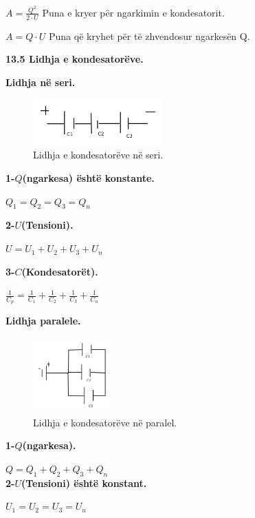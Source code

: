 \documentclass[twocolumn]{article}
\begin{document}
	$A=\frac{Q^2}{2\cdot U}$ Puna e kryer për ngarkimin e kondesatorit.
	
	$A=Q \cdot U$ Puna që kryhet për të zhvendosur ngarkesën Q.
	
	\textbf{13.5 Lidhja e kondesatorëve. }
	
	\begin{center}
		\textbf{Lidhja në seri.}
	\end{center}
	
	\begin{figure}[h]
		\includegraphics[width=50mm]{Imazhet/Lidhjet ne seri.png}
		\caption{ Lidhja e kondesatorëve në seri.}
		\label{fig:boat1}
	\end{figure}
	
	\textbf{1-$Q$(ngarkesa) është konstante.}
	
	$Q_1=Q_2=Q_3=Q_n$
	
	\textbf{2-$U$(Tensioni).}
	
	$U=U_1+U_2+U_3+U_n$
	
	\textbf{3-$C$(Kondesatorët).}
	
	$\frac{1}{C_p}=\frac{1}{C_1}+\frac{1}{C_2}+\frac{1}{C_3}+\frac{1}{C_n}$
	
	
	\begin{center}
		\textbf{Lidhja paralele.}
	\end{center}
	\begin{figure}[h]
		\includegraphics[width=30mm]{Imazhet/Lidhjet paralele.png}
		\caption{ Lidhja e kondesatorëve në paralel.}
		\label{fig:boat1}
		
		
	\end{figure}
	
	\textbf{1-$Q$(ngarkesa).}
	
	$Q=Q_1+Q_2+Q_3+Q_n$\\
	
	\textbf{2-$U$(Tensioni) është konstant.}
	
	$U_1=U_2=U_3=U_n$\\
	
\end{document}
